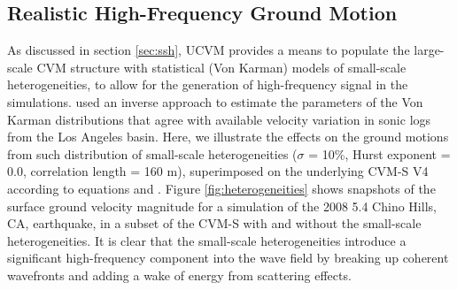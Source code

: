 
\subsection{Realistic High-Frequency Ground Motion}

As discussed in section \ref{sec:ssh}, UCVM provides a means to populate the large-scale CVM structure with statistical (Von Karman) models of small-scale heterogeneities, to allow for the generation of high-frequency signal in the simulations. \citet{Olsen_2014_USGS} used an inverse approach to estimate the parameters of the Von Karman distributions that agree with available velocity variation in sonic logs from the Los Angeles basin. Here, we illustrate the effects on the ground motions from such distribution of small-scale heterogeneities ($\sigma$ = 10\%, Hurst exponent = 0.0, correlation length = 160 m), superimposed on the underlying CVM-S V4 according to equations  and . Figure \ref{fig:heterogeneities} shows snapshots of the surface ground velocity magnitude for a simulation of the 2008  5.4 Chino Hills, CA, earthquake, in a subset of the CVM-S with and without the small-scale heterogeneities.  It is clear that the small-scale heterogeneities introduce a significant high-frequency component into the wave field by breaking up coherent wavefronts and adding a wake of energy from scattering effects.



